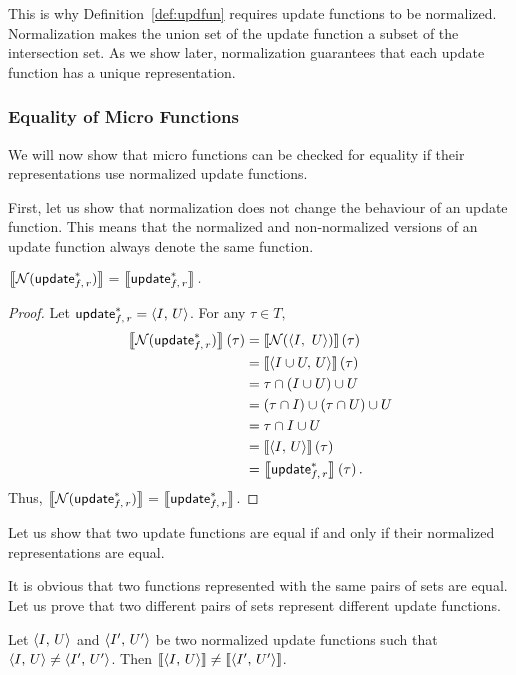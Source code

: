 This is why Definition~\ref{def:updfun} requires update functions to be normalized. Normalization makes the union set of the update function a subset of the intersection set.
As we show later, normalization guarantees that each update function has a unique representation.

\subsubsection{Equality of Micro Functions}\label{sec:equality}
We will now show that micro functions can be checked for equality if their representations use normalized update functions.

First, let us show that normalization does not change the behaviour of an update function. This means that the normalized and non-normalized versions of an update function always denote the same function.

\newpage    
\begin{lemma}\label{lem:normeq}
    $\left\llbracket\mathcal N(\textsf{update}_{f,\,r}^*)\right\rrbracket=\left\llbracket\textsf{update}_{f,\,r}^*\right\rrbracket.$
\end{lemma}

\begin{proof}
    Let $\textsf{update}_{f,\,r}^*=\left\langle I,\,U\right\rangle$.
    For any $\tau\in T,$
    \[
        \begin{aligned}
            \left\llbracket\mathcal N(\textsf{update}_{f,\,r}^*)\right\rrbracket(\tau)
            &=\left\llbracket\mathcal N(\langle I,\ U\rangle)\right\rrbracket(\tau)\\
            &=\left\llbracket\left\langle I\cup U,\,U\right\rangle\right\rrbracket(\tau)\\
            &=\tau\cap(I\cup U)\cup U\\
            &=(\tau\cap I)\cup(\tau\cap U)\cup U\\
            &=\tau\cap I\cup U\\
            &=\left\llbracket\left\langle I,\,U\right\rangle\right\rrbracket(\tau)\\
            &=\left\llbracket\textsf{update}_{f,\,r}^*\right\rrbracket(\tau)\,.
        \end{aligned}
    \]
    Thus, $\left\llbracket\mathcal N(\textsf{update}_{f,\,r}^*)\right\rrbracket=\left\llbracket\textsf{update}_{f,\,r}^*\right\rrbracket$.
\end{proof}

Let us show that two update functions are equal if and only if their normalized representations are equal.

It is obvious that two functions represented with the same pairs of sets are equal. Let us prove that two different pairs of sets represent different update functions.

\begin{lemma}
    Let $\left\langle I,\,U\right\rangle$ and $\left\langle I',\,U'\right\rangle$ be two normalized update functions such that $\left\langle I,\,U\right\rangle\ne\left\langle I',\,U'\right\rangle$. Then $\left\llbracket\left\langle I,\,U\right\rangle\right\rrbracket\ne\left\llbracket\left\langle I',\,U'\right\rangle\right\rrbracket$.
\end{lemma}

